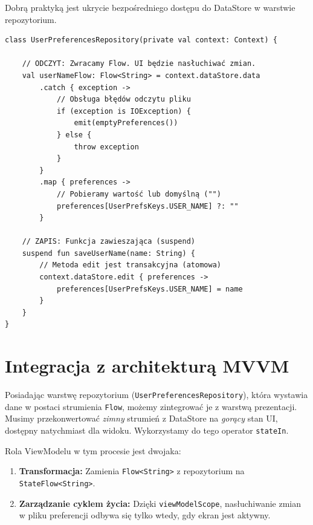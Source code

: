 Dobrą praktyką jest ukrycie bezpośredniego dostępu do DataStore w warstwie repozytorium.

\begin{verbatim}
class UserPreferencesRepository(private val context: Context) {

    // ODCZYT: Zwracamy Flow. UI będzie nasłuchiwać zmian.
    val userNameFlow: Flow<String> = context.dataStore.data
        .catch { exception ->
            // Obsługa błędów odczytu pliku
            if (exception is IOException) {
                emit(emptyPreferences())
            } else {
                throw exception
            }
        }
        .map { preferences ->
            // Pobieramy wartość lub domyślną ("")
            preferences[UserPrefsKeys.USER_NAME] ?: ""
        }

    // ZAPIS: Funkcja zawieszająca (suspend)
    suspend fun saveUserName(name: String) {
        // Metoda edit jest transakcyjna (atomowa)
        context.dataStore.edit { preferences ->
            preferences[UserPrefsKeys.USER_NAME] = name
        }
    }
}
\end{verbatim}

\section{Integracja z architekturą MVVM}

Posiadając warstwę repozytorium (\texttt{UserPreferencesRepository}), która wystawia dane w postaci strumienia \texttt{Flow}, możemy zintegrować je z warstwą prezentacji. Musimy przekonwertować \textit{zimny} strumień z DataStore na \textit{gorący} stan UI, dostępny natychmiast dla widoku. Wykorzystamy do tego operator \texttt{stateIn}.

Rola ViewModelu w tym procesie jest dwojaka:
\begin{enumerate}
    \item \textbf{Transformacja:} Zamienia \texttt{Flow<String>} z repozytorium na \texttt{StateFlow<String>}.
    \item \textbf{Zarządzanie cyklem życia:} Dzięki \texttt{viewModelScope}, nasłuchiwanie zmian w pliku preferencji odbywa się tylko wtedy, gdy ekran jest aktywny.
\end{enumerate}

